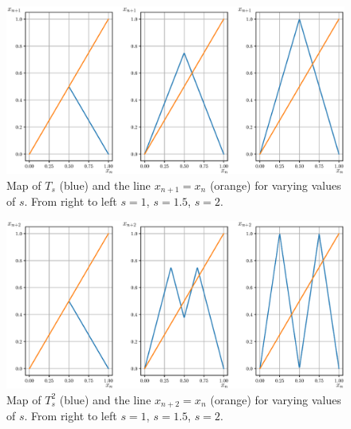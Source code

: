 \documentclass{article}
\begin{document}
\begin{figure}[H]
    \centering
    \hspace{-0.50in}
    \includegraphics[scale = 0.65]{Figure_8.eps}
	\caption{Map of $T_s$ (blue) and the line $x_{n+1} = x_n$ (orange) for varying values of $s$. From right to 
    left $s = 1$, $s= 1.5$, $s=2$.}
    \label{fig:tent_map_comp}
\end{figure}

\begin{figure}[H]
    \centering
    \hspace{-0.50in}
    \includegraphics[scale = 0.65]{Figure_9.eps}
	\caption{Map of $T^2_s$ (blue) and the line $x_{n+2} = x_n$ (orange) for varying values of $s$. From right to 
    left $s = 1$, $s= 1.5$, $s=2$.}
    \label{fig:tent_map_2_comp}
\end{figure}
\end{document}
